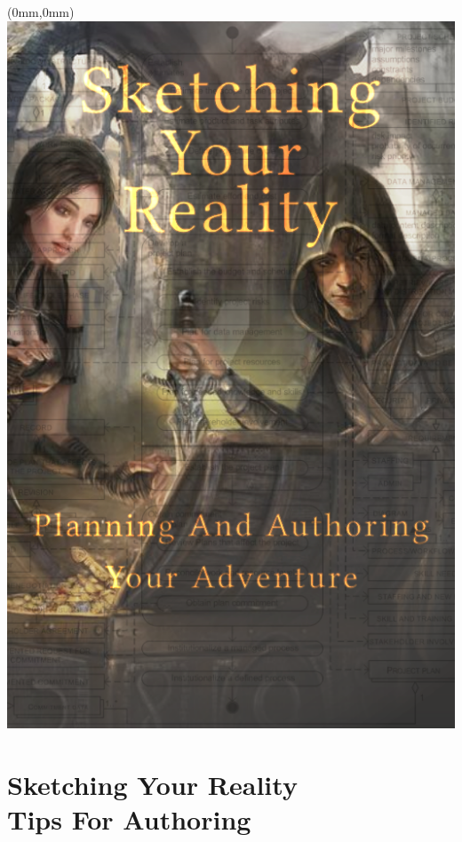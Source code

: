 \documentclass[10pt,openany,final]{memoir}
\begin{document}
\chapter*{}
\begin{textblock*}{70.9mm}(0mm,0mm)
\includegraphics[width=\paperwidth]{./media/images/planning_if.png}
\end{textblock*}

\chapter{Sketching Your Reality \\ \small{Tips For Authoring}}

\end{document}
